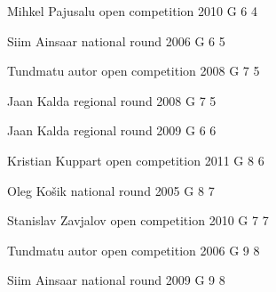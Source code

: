\documentclass[11pt]{article}
\begin{document}
\ylDisplay{} %
{Mihkel Pajusalu} %
{open competition} %
{2010} %
{G 6} %
{4} %
{

\ifEngSolution
\fi
}

\ylDisplay{} %
{Siim Ainsaar} %
{national round} %
{2006} %
{G 6} %
{5} %
{

\ifEngSolution
\fi
}

\ylDisplay{} %
{Tundmatu autor} %
{open competition} %
{2008} %
{G 7} %
{5} %
{

\ifEngSolution
\fi
}

\ylDisplay{} %
{Jaan Kalda} %
{regional round} %
{2008} %
{G 7} %
{5} %
{

\ifEngSolution
\fi
}

\ylDisplay{} %
{Jaan Kalda} %
{regional round} %
{2009} %
{G 6} %
{6} %
{

\ifEngSolution
\fi
}

\ylDisplay{} %
{Kristian Kuppart} %
{open competition} %
{2011} %
{G 8} %
{6} %
{

\ifEngSolution
\fi
}

\ylDisplay{} %
{Oleg Košik} %
{national round} %
{2005} %
{G 8} %
{7} %
{

\ifEngSolution
\fi
}

\ylDisplay{} %
{Stanislav Zavjalov} %
{open competition} %
{2010} %
{G 7} %
{7} %
{

\ifEngSolution
\fi
}

\ylDisplay{} %
{Tundmatu autor} %
{open competition} %
{2006} %
{G 9} %
{8} %
{

\ifEngSolution
\fi
}

\ylDisplay{} %
{Siim Ainsaar} %
{national round} %
{2009} %
{G 9} %
{8} %
{

\ifEngSolution
\fi
}
\end{document}
